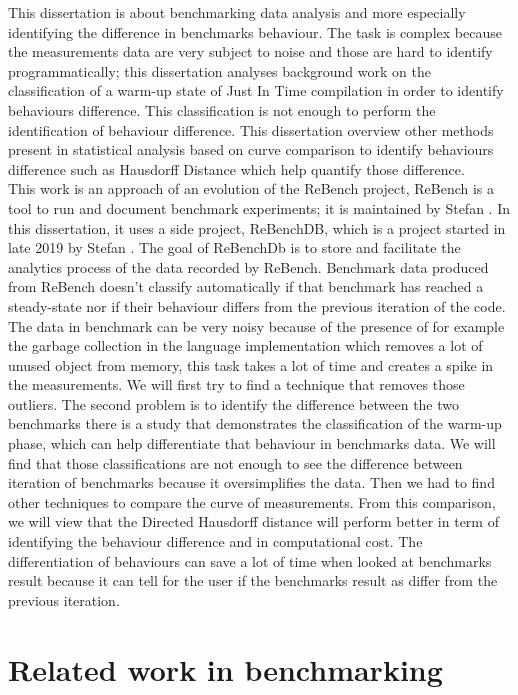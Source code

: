 \documentclass[12pt,a4paper]{article}
\begin{document}
This dissertation is about benchmarking data analysis and more especially identifying the difference in benchmarks behaviour. The task is complex because the measurements data are very subject to noise and those are hard to identify programmatically; this dissertation analyses background work on the classification of a warm-up state of Just In Time compilation in order to identify behaviours difference. This classification is not enough to perform the identification of behaviour difference. This dissertation overview other methods present in statistical analysis based on curve comparison to identify behaviours difference such as Hausdorff Distance which help quantify those difference.\\
This work is an approach of an evolution of the ReBench project, ReBench is a tool to run and document benchmark experiments; it is maintained by Stefan \citeauthor{ReBench:2018}. In this dissertation, it uses a side project, ReBenchDB, which is a project started in late 2019 by Stefan \citeauthor{ReBench:2018}. The goal of ReBenchDb is to store and facilitate the analytics process of the data recorded by ReBench. Benchmark data produced from ReBench doesn't classify automatically if that benchmark has reached a steady-state nor if their behaviour differs from the previous iteration of the code.
The data in benchmark can be very noisy because of the presence of for example the garbage collection in the language implementation which removes a lot of unused object from memory, this task takes a lot of time and creates a spike in the measurements. We will first try to find a technique that removes those outliers. The second problem is to identify the difference between the two benchmarks there is a study that demonstrates the classification of the warm-up phase, which can help differentiate that behaviour in benchmarks data. We will find that those classifications are not enough to see the difference between iteration of benchmarks because it oversimplifies the data. Then we had to find other techniques to compare the curve of measurements. From this comparison, we will view that the Directed Hausdorff distance will perform better in term of identifying the behaviour difference and in computational cost. The differentiation of behaviours can save a lot of time when looked at benchmarks result because it can tell for the user if the benchmarks result as differ from the previous iteration. 

\section{Related work in benchmarking}
\end{document}
